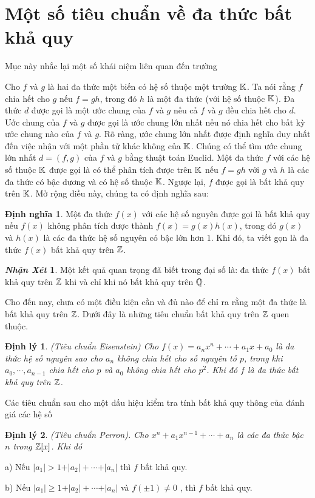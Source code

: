 \documentclass[a5paper,12pt]{report}
\theoremstyle{definition}
\newtheorem{dinhngia}{Định nghĩa}[section]
\newtheorem{dinhly}{Định lý}[section]
\newtheorem{nhanxet}{{\it\bfseries Nhận Xét}}[section]
\newcommand{\dn}{\begin{dinhngia}}
\newcommand{\hdn}{\end{dinhngia}}
\newcommand{\dl}{\begin{dinhly}\itshape}
\newcommand{\hdl}{\end{dinhly}}
\newcommand{\nx}{\begin{nhanxet}}
\newcommand{\hnx}{\end{nhanxet}}
\def\geq{\geqslant}
\numberwithin{equation}{chapter}
\begin{document}
	\section{Một số tiêu chuẩn về đa thức bất khả quy}
	\hskip 0.6cm Mục này nhắc lại một số khái niệm liên quan đến trường
	\par Cho $f$ và $g$ là hai đa thức một biến có hệ số thuộc một trường $\Bbb K$. Ta nói rằng $f$ chia hết cho $g$ nếu $f=gh$, trong đó $h$ là một đa thức (với hệ số thuộc $\Bbb K$). Đa thức $d$ được gọi là một ước chung của $f$ và $g$ nếu cả $f$ và $g$ đều chia hết cho $d$. Ước chung của $f$ và $g$ được gọi là ước chung lớn nhất nếu nó  chia hết cho bất kỳ ước chung nào của $f$ và $g$. Rõ ràng, ước chung lớn nhất được định nghĩa duy nhất đến việc nhận với một phần tử khác không của $\Bbb K$. Chúng  có thể tìm ước chung lớn nhất $d=(f,g)$ của $f$ và $g$ bằng thuật toán Euclid. Một đa thức $f$ với các hệ số thuộc $\Bbb K$ được gọi là có thể phân tích được trên $\Bbb K$ nếu $f=gh$ với $g$ và $h$ là các đa thức có bậc dương và có hệ số thuộc $\Bbb K$. Ngược lại, $f$ được gọi là bất khả quy trên $\Bbb K$. Mở rộng điều này, chúng ta có định nghĩa sau:
	\dn Một đa thức $f(x)$ với các hệ số nguyên được gọi là bất khả quy nếu $f(x)$ không phân tích được thành $f(x)=g(x)h(x)$, trong đó $g(x)$ và $h(x)$ là các đa thức hệ số nguyên có bậc lớn hơn $1$. Khi đó, ta viết gọn là đa thức $f(x)$ bất khả quy trên $\Bbb Z$.
	\hdn
	\nx
	Một kết quả quan trọng đã biết trong đại số là:  đa thức $f(x)$ bất khả quy trên $\Bbb Z$ khi và chỉ khi nó bất khả quy trên $\Bbb Q$.
	\hnx	
	Cho đến nay, chưa có một điều kiện cần và đủ nào để chỉ ra rằng một đa thức là bất khả quy trên $\Bbb Z$. Dưới đây là những tiêu chuẩn bất khả quy  trên $\Bbb Z$ quen thuộc.
	\dl \label{E} (Tiêu chuẩn Eisenstein) Cho $f(x)=a_nx^n+\cdots+a_1x+a_0$ là đa thức hệ số nguyên sao cho $a_n$ không chia hết cho số nguyên tố $p$, trong khi $a_0, \cdots,a_{n-1}$ chia hết cho $p$  và $a_0$ không chia hết cho $p^2$. Khi đó $f$ là đa thức bất khả quy trên $\Bbb Z$.
	\hdl
	Các tiêu chuẩn sau cho một dấu hiệu kiểm tra tính bất khả quy thông của đánh giá các hệ số
	\dl \label{Pe}  (Tiêu chuẩn Perron). Cho   $x^n +a_1x^{n-1} + \cdots +a_n$ là các đa thức bậc $n$ trong $\Bbb Z[x]$. Khi đó
	\par
	a) Nếu $\vert a_1\vert>1+\vert a_2\vert+\cdots+\vert a_n\vert$ thì $f$ bất khả quy.
	\par
	b) Nếu  $\vert a_1\vert\geq 1+\vert a_2\vert+\cdots+\vert a_n\vert$ và $f(\pm 1)\ne 0$ , thì $f$ bất khả quy.
	\hdl
	
\end{document}
